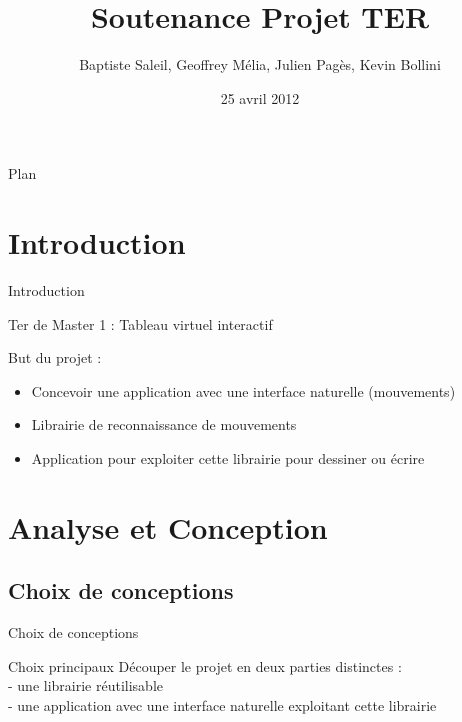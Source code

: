 \documentclass{beamer}
\title{Soutenance Projet TER}
\author{Baptiste Saleil, Geoffrey Mélia, Julien Pagès, Kevin Bollini}
\date{25 avril 2012}
\begin{document}
	\begin{frame}
		\titlepage
	\end{frame}

	\begin{frame}{Plan}
		\tableofcontents
	\end{frame}

	\section{Introduction}
		\begin{frame}{Introduction}
		\begin{center}
		\LARGE{Ter de Master 1 : Tableau virtuel interactif}
		\end{center}
		
		But du projet :
		\begin{itemize}
		\item Concevoir une application avec une interface naturelle (mouvements)
		\item Librairie de reconnaissance de mouvements
		\item Application pour exploiter cette librairie pour dessiner ou écrire
		\end{itemize}
		
		\end{frame}

		
	\section{Analyse et Conception}
	\subsection{Choix de conceptions}
		\begin{frame}{Choix de conceptions}
			\begin{block}{Choix principaux}
				Découper le projet en deux parties distinctes : \\
				- une librairie réutilisable \\
				- une application avec une interface naturelle exploitant cette librairie \\
			\end{block}
		\end{frame}
		
\end{document}
